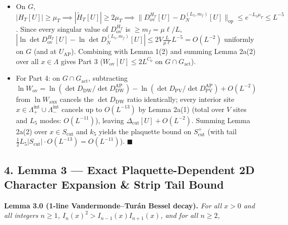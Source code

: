 \documentclass[11pt,a4paper]{article}
\begin{document}
\begin{itemize}
On $G_+^{\text{cap}}$, $|\theta_p| \le \theta_\varepsilon < \pi/3 \implies \theta_p^2 \le 3(1 - \cos\theta_p)$, so $\sum_{p \subset \Lambda_+} \theta_p^2 \le 3 K (e\ell)^2 = K'(e\ell)^2$, giving $|v_+[U_+]| \le \frac{1}{2} L_5 C_{\text{PV}}(\mu_0) K'(e\ell)^2$. Adding the identical bound on $G_-^{\text{cap}}$ and using $L_5 = \lceil \frac{5}{\mu_T} \ln L \rceil \le \frac{6}{\mu_T} \ln L$ (valid for all $L \ge e^{\mu_T}$, hence all $L \ge 2$) gives $|v_+[U_+] + v_-[U_-]| \le L_5 C_{\text{PV}}(\mu_0) K'(e\ell)^2 \le C_0 \ln L$. Multiplying by $\det D_{\text{DW}}^{(L_5)}[U] / \det D_{\text{DW}}^{(L_5)}[U_{\text{AP}}] \le 1$ (Lemma 1(2)) yields $0 \le W_{\text{aux}}[U] \le L^{C_0}$ {\bfseries\boldmath everywhere on $U(1)^{2V}$}.
\item{} On $G$, $|H_T[U]| \ge \mu_T \implies |\tilde{H}_T[U]| \ge 2\mu_T \implies \|D_{\text{ov}}^{H_T}[U] - D_N^{(L_5, m_f)}[U]\|_{\text{op}} \le e^{-L_5 \mu_T} \le L^{-5}$. Since every singular value of $D_{\text{ov}}^{H_T}$ is $\ge m_f = \mu\ell/L$, $|\ln\det D_{\text{ov}}^{H_T}[U] - \ln\det D_N^{(L_5, m_f)}[U]| \le 2 V \frac{L}{\mu\ell} L^{-5} = O(L^{-2})$ uniformly on $G$ (and at $U_{\text{AP}}$). Combining with Lemma 1(2) and summing Lemma 2a(2) over all $x \in \Lambda$ gives Part 3 ($W_{\text{ov}}[U] \le 2 L^{C_0}$ on $G \cap G_{\text{act}}$).
\item{} For Part 4: on $G \cap G_{\text{act}}$, subtracting $\ln W_{\text{ov}} = \ln(\det D_{\text{DW}} / \det D_{\text{DW}}^{\text{AP}}) - \ln(\det D_{\text{PV}} / \det D_{\text{PV}}^{\text{AP}}) + O(L^{-2})$ from $\ln W_{\text{aux}}$ cancels the $\det D_{\text{DW}}$ ratio identically; every interior site $x \in \Lambda_+^{\text{int}} \cup \Lambda_-^{\text{int}}$ cancels up to $O(L^{-13})$ by Lemma 2a(1) (total over $V$ sites and $L_5$ modes: $O(L^{-11})$), leaving $\Delta_{\text{cut}}[U] + O(L^{-2})$. Summing Lemma 2a(2) over $x \in S_{\text{cut}}$ and $k_5$ yields the plaquette bound on $S_{\text{cut}}^+$ (with tail $\frac{1}{2} L_5 |S_{\text{cut}}| \cdot O(L^{-13}) = O(L^{-11})$). $\blacksquare$
\end{itemize}


\subsection*{4. Lemma 3 --- Exact Plaquette-Dependent 2D Character Expansion \& Strip Tail Bound}
{\bfseries\boldmath Lemma 3.0 (1-line Vandermonde--Tur\'an Bessel decay).} \emph{For all $x > 0$ and all integers $n \ge 1$, $I_n(x)^2 > I_{n-1}(x) I_{n+1}(x)$, and for all $n \ge 2$,}
\end{document}
